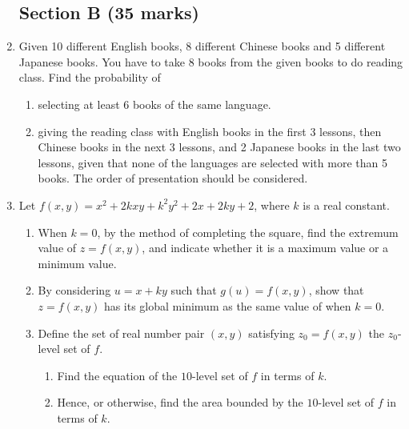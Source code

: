 \documentclass[12pt]{article}
\begin{document}
\begin{enumerate}
        \subsection*{Section B (35 marks)}
        \item Given 10 different English books, 8 different Chinese books and 5 different Japanese books. You have to take 8 books from the given books to do reading class. Find the probability of\begin{enumerate}
            \item selecting at least 6 books of the same language.
            \item giving the reading class with English books in the first 3 lessons, then Chinese books in the next 3 lessons, and 2 Japanese books in the last two lessons, given that none of the languages are selected with more than 5 books. The order of presentation should be considered.
        \end{enumerate}

        \item Let $f(x,y)=x^2+2kxy+k^2y^2+2x+2ky+2$, where $k$ is a real constant.\begin{enumerate}
            \item When $k=0$, by the method of completing the square, find the extremum value of $z=f(x,y)$, and indicate whether it is a maximum value or a minimum value.
            \item By considering $u=x+ky$ such that $g(u)=f(x,y)$, show that $z=f(x,y)$ has its global minimum as the same value of when $k=0$.
            \item Define the set of real number pair $(x,y)$ satisfying $z_0=f(x,y)$ the $z_0$-level set of $f$.\begin{enumerate}
                \item Find the equation of the $10$-level set of $f$ in terms of $k$.
                \item Hence, or otherwise, find the area bounded by the $10$-level set of $f$ in terms of $k$.
            \end{enumerate}
        \end{enumerate}
    \end{enumerate}
\end{document}

